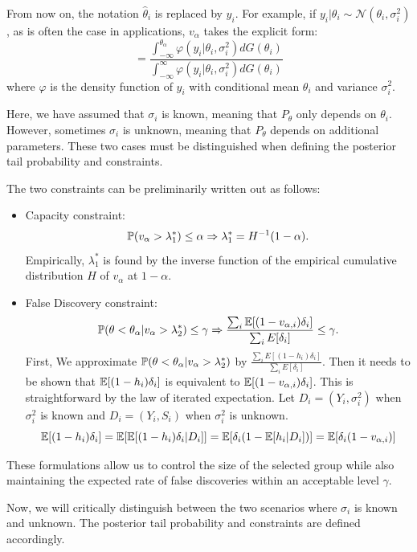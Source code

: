 \documentclass[12pt]{article}
\begin{document}
From now on, the notation \(\hat{\theta}_i\) is replaced by \(y_i\). For
example, if \(y_i|\theta_i \sim \mathcal{N}(\theta_i, \sigma_i^2)\), as is
often the case in applications, \(v_\alpha\) takes the explicit form:
\begin{equation*}
    = \frac{\int_{-\infty}^{\theta_{\alpha}} \varphi(y_i | \theta_i, \sigma_i^2) dG(\theta_i)}
    {\int_{-\infty}^{\infty} \varphi(y_i | \theta_i, \sigma_i^2) dG(\theta_i)}
\end{equation*}
where \(\varphi\) is the density function of \(y_i\) with conditional mean \(\theta_i\) and variance \(\sigma_i^2\).

Here, we have assumed that \(\sigma_i\) is known, meaning that \(P_\theta\)
only depends on \(\theta_i\). However, sometimes \(\sigma_i\) is unknown,
meaning that \(P_\theta\) depends on additional parameters. These two cases
must be distinguished when defining the posterior tail probability and
constraints.

The two constraints can be preliminarily written out as follows:
\begin{itemize}
    \item Capacity constraint: \[ \mathbb{P}(v_\alpha>\lambda_1^*) \le \alpha \Rightarrow \lambda_1^* = H^{-1}(1-\alpha). \] Empirically, $\lambda_1^*$ is found by the inverse function of the empirical
          cumulative distribution $H$ of $v_\alpha$ at $1-\alpha$.
    \item False Discovery constraint: \[ \mathbb{P}(\theta<\theta_\alpha|v_\alpha>\lambda_2^*) \le \gamma \Rightarrow  \frac{\sum_i \mathbb{E}[(1-v_{\alpha,i})\delta_i]}{\sum_i E[ \delta_i]}\le \gamma.\] First, We approximate $\mathbb{P}(\theta<\theta_\alpha|v_\alpha>\lambda_2^*)$ by
          $\frac{\sum_i E[ (1-h_i)\delta_i]}{\sum_i E[ \delta_i]}$. Then it needs to be
          shown that $\mathbb{E}[ (1-h_i)\delta_i]$ is equivalent to
          $\mathbb{E}[(1-v_{\alpha,i})\delta_i]$. This is straightforward by the law of iterated
          expectation. Let $D_i = (Y_i,\sigma_i^2)$ when $\sigma_i^2$ is known and $D_i =
              (Y_i,S_i)$ when $\sigma_i^2$ is unknown.
          \[ \mathbb{E}[(1-h_i)\delta_i] = \mathbb{E}[\mathbb{E}[(1-h_i)\delta_i|D_i]] = \mathbb{E}[\delta_i(1-\mathbb{E}[h_i|D_i])] = \mathbb{E}[\delta_i(1-v_{\alpha,i})] \]
\end{itemize}
These formulations allow us to control the size of the selected group while also maintaining the expected rate of false discoveries within an acceptable level \(\gamma\).

Now, we will critically distinguish between the two scenarios where
\(\sigma_i\) is known and unknown. The posterior tail probability and
constraints are defined accordingly.
\end{document}
